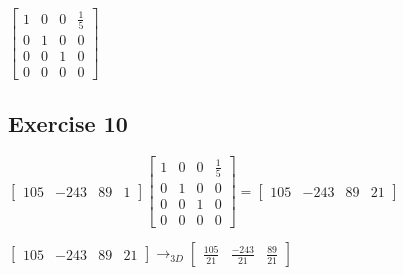 \documentclass[11pt]{article}
\begin{document}
$
\begin{bmatrix}
1 & 0 & 0 & \frac{1}{5} \\
0 & 1 & 0 & 0 \\
0 & 0 & 1 & 0 \\
0 & 0 & 0 & 0
\end{bmatrix}
$

\subsection{Exercise 10}

$\begin{bmatrix}
105 & -243 & 89 & 1
\end{bmatrix}
\begin{bmatrix}
1 & 0 & 0 & \frac{1}{5} \\
0 & 1 & 0 & 0 \\
0 & 0 & 1 & 0 \\
0 & 0 & 0 & 0
\end{bmatrix}=
\begin{bmatrix}
105 & -243 & 89 & 21
\end{bmatrix}$

$
\begin{bmatrix}
105 & -243 & 89 & 21
\end{bmatrix}\to_{3D}
\begin{bmatrix}
\frac{105}{21} & \frac{-243}{21} & \frac{89}{21}
\end{bmatrix}
$
\end{document}
